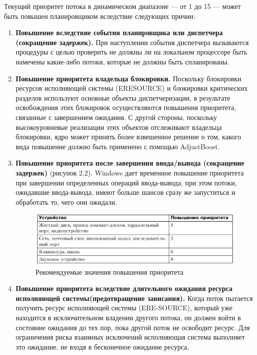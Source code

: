 Текущий приоритет потока в динамическом диапазоне — от 1 до 15 — может быть повышен
планировщиком вследствие следующих причин:
\begin{enumerate}
	\item \textbf{Повышение вследствие события планировщика или диспетчера (сокращение
	задержек).} При наступлении события диспетчера вызываются процедуры с целью проверить не должны ли на локальном процессоре быть намечены какие-либо потоки, которые не должны быть спланированы.
	\item \textbf{Повышение приоритета владельца блокировки.} Поскольку блокировки ресурсов
	исполняющей системы (ERESOURCE) и блокировки критических разделов используют основные объекты диспетчеризации, в результате освобождения этих блокировок
	осуществляются повышения приоритета, связанные с завершением ожидания. С другой стороны, поскольку высокоуровневые реализации этих объектов отслеживают владельца блокировки, ядро может принять более взвешенное решение о том, какого вида
	повышение должно быть применено с помощью AdjustBoost.
	\item \textbf{Повышение приоритета после завершения ввода/вывода (сокращение задержек)} (рисунок 2.2). Windows дает временное повышение приоритета при завершении
	определенных операций ввода-вывода, при этом потоки, ожидавшие ввода-вывода, имеют больше шансов сразу же запуститься и обработать то, чего они ожидали.
	\begin{figure}[H]
		\begin{center}
			\includegraphics[scale=0.7]{assets/rec_pr.png}
		\end{center}
		\caption{Рекомендуемые значения повышения приоритета}
	\end{figure}
	\item \textbf{Повышение приоритета вследствие длительного ожидания ресурса исполняющей системы(предотвращение зависания).} Когда поток пытается получить
	ресурс исполняющей системы (ERE-SOURCE), который уже находится в исключительном владении другого потока, он должен войти в состояние ожидания до тех пор, пока
	другой поток не освободит ресурс. Для ограничения риска взаимных исключений исполняющая система выполняет это ожидание, не входя в бесконечное ожидание ресурса,

\end{enumerate}

